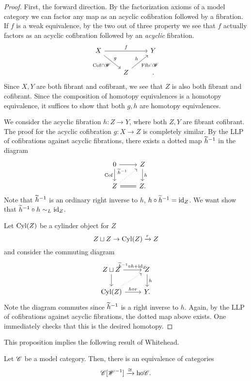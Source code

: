\documentclass[11pt]{amsart}
\def\Cyl{{\rm Cyl}}
\def\ho{{\rm ho}}
\begin{document}
\begin{proof}
First, the forward direction. 
By the factorization axioms of a model category we can factor any map as an acyclic cofibration followed by a fibration. 
If $f$ is a weak equivalence, by the two out of three property we see that $f$ actually factors as an acyclic cofibration followed by an {\em acyclic} fibration. 
\[
\begin{tikzcd}
X \ar[rr,"f"] \ar[dr, "{\rm Cof} \cap \sW"', "g"] & & Y \\
& Z \ar[ur, "{\rm Fib} \cap \sW"', "h"] & .
\end{tikzcd}
\]
Since $X,Y$ are both fibrant and cofibrant, we see that $Z$ is also both fibrant and cofibrant. 
Since the composition of homotopy equivalences is a homotopy equivalence, it suffices to show that both $g,h$ are homotopy equivalences. 

We consider the acyclic fibration $h : Z \to Y$, where both $Z,Y$ are fibrant cofibrant.
The proof for the acyclic cofibration $g : X \to Z$ is completely similar.
By the LLP of cofibrations against acyclic fibrations, there exists a dotted map $\Tilde{h}^{-1}$ in the diagram
\[
\begin{tikzcd}
0 \ar[r] \ar[d,"{\rm Cof}"'] & Z \ar[d, "h"] \\
Z \ar[r, equals] \ar[ur, dotted, "\Tilde{h}^{-1}"] & Z .
\end{tikzcd}
\]
Note that $\Tilde{h}^{-1}$ is an ordinary right inverse to $h$, $h \circ \Tilde{h}^{-1} = \id_Z$.
We want show that $\Tilde{h}^{-1} \circ h \sim_L \id_Z$. 

Let $\Cyl(Z)$ be a cylinder object for $Z$
\[
Z \sqcup Z \to \Cyl(Z) \xto{r} Z
\] 
and consider the commuting diagram
\[
\begin{tikzcd}
Z \sqcup Z \ar[d] \ar[r, "\Tilde{h}^{-1} \circ h + \id_Z"] & Z \ar[d,"h"] \\
\Cyl(Z) \ar[ur, dotted] \ar[r, "h \circ r"] & Y .
\end{tikzcd}
\]
Note the diagram commutes since $\Tilde{h}^{-1}$ is a right inverse to $h$. 
Again, by the LLP of cofibrations against acyclic fibrations, the dotted map above exists. 
One immediately checks that this is the desired homotopy. 


\end{proof}

This proposition implies the following result of Whitehead. 

\begin{thm}[Whitehead]
Let $\sC$ be a model category. 
Then, there is an equivalence of categories
\[
\sC[\sW^{-1}] \xto{\cong} \ho \sC .
\]
\end{thm}
\end{document}

